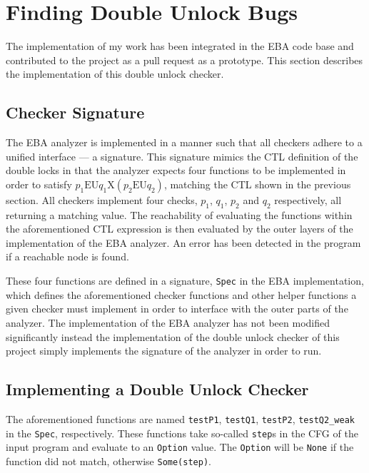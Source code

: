 \section{Finding Double Unlock Bugs}

\newpar The implementation of my work has been integrated in the EBA code base and contributed to the project as a pull request as a prototype. This section describes the implementation of this double unlock checker.

\subsection{Checker Signature}

\newpar The EBA analyzer is implemented in a manner such that all checkers adhere to a unified interface --- a signature. This signature mimics the CTL definition of the double locks in that the analyzer expects four functions to be implemented in order to satisfy $p_1 \mathrm{EU} q_1 \mathrm{X}(p_2 \mathrm{EU} q_2)$, matching the CTL shown in the previous section. All checkers implement four checks, $p_1$, $q_1$, $p_2$ and $q_2$ respectively, all returning a matching value. The reachability of evaluating the functions within the aforementioned CTL expression is then evaluated by the outer layers of the implementation of the EBA analyzer. An error has been detected in the program if a reachable node is found. 

\newpar These four functions are defined in a signature, \texttt{Spec} in the EBA implementation, which defines the aforementioned checker functions and other helper functions a given checker must implement in order to interface with the outer parts of the analyzer. The implementation of the EBA analyzer has not been modified significantly instead the implementation of the double unlock checker of this project simply implements the signature of the analyzer in order to run. 

\subsection{Implementing a Double Unlock Checker}

\newpar The aforementioned functions are named \texttt{testP1}, \texttt{testQ1}, \texttt{testP2}, \texttt{testQ2\_weak} in the \texttt{Spec}, respectively. These functions take so-called \texttt{step}s in the CFG of the input program and evaluate to an \texttt{Option} value. The \texttt{Option} will be \texttt{None} if the function did not match, otherwise \texttt{Some(step)}. 

